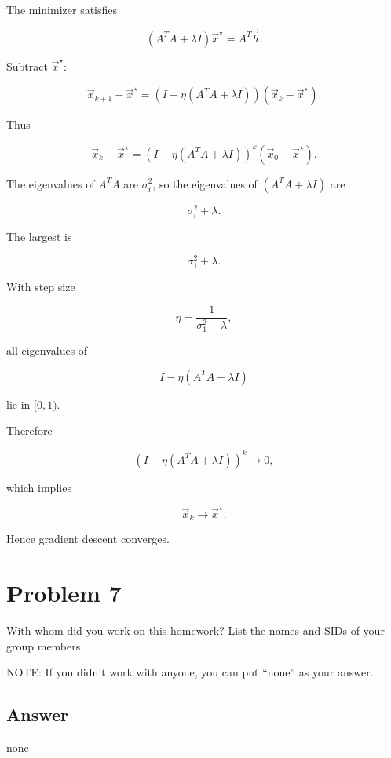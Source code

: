 \documentclass[
  12pt,
]{fphw}
\begin{document}
\begin{enumerate}
The minimizer satisfies

\[
(A^TA+\lambda I)\vec{x}^\star = A^T\vec{b}.
\]

Subtract $\vec{x}^\star$:

\[
\vec{x}_{k+1}-\vec{x}^\star
=
(I-\eta(A^TA+\lambda I))(\vec{x}_k-\vec{x}^\star).
\]

Thus

\[
\vec{x}_k-\vec{x}^\star
=
(I-\eta(A^TA+\lambda I))^k
(\vec{x}_0-\vec{x}^\star).
\]

The eigenvalues of $A^TA$ are $\sigma_i^2$, so the eigenvalues of $(A^TA+\lambda I)$ are

\[
\sigma_i^2 + \lambda.
\]

The largest is

\[
\sigma_1^2 + \lambda.
\]

With step size

\[
\eta = \frac{1}{\sigma_1^2+\lambda},
\]

all eigenvalues of

\[
I-\eta(A^TA+\lambda I)
\]

lie in $[0,1)$.

Therefore

\[
(I-\eta(A^TA+\lambda I))^k \to 0,
\]

which implies

\[
\vec{x}_k \to \vec{x}^\star.
\]

Hence gradient descent converges.

\end{enumerate}

\section*{Problem 7}

With whom did you work on this homework? List the names and SIDs of your group members.

NOTE: If you didn’t work with anyone, you can put “none” as your answer.

\subsection*{Answer}
none

\end{document}
